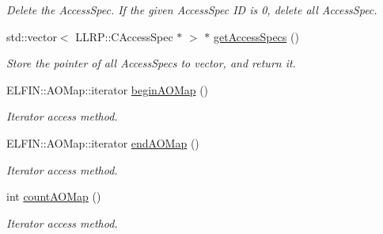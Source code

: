 \begin{DoxyCompactItemize}
\begin{DoxyCompactList}\small\item\em Delete the Access\-Spec. If the given Access\-Spec I\-D is 0, delete all Access\-Spec. \end{DoxyCompactList}\item 
std\-::vector$<$ L\-L\-R\-P\-::\-C\-Access\-Spec $\ast$ $>$ $\ast$ \hyperlink{class_e_l_f_i_n_1_1_a_o_admin_a5bfd2b0c57333304d53c5cea1cdff0f0}{get\-Access\-Specs} ()
\begin{DoxyCompactList}\small\item\em Store the pointer of all Access\-Specs to vector, and return it. \end{DoxyCompactList}\end{DoxyCompactItemize}
{\bf }\par
\begin{DoxyCompactItemize}
\item 
E\-L\-F\-I\-N\-::\-A\-O\-Map\-::iterator \hyperlink{class_e_l_f_i_n_1_1_a_o_admin_abd2953505ee15f57f80bf8d5c094297b}{begin\-A\-O\-Map} ()
\begin{DoxyCompactList}\small\item\em Iterator access method. \end{DoxyCompactList}\item 
E\-L\-F\-I\-N\-::\-A\-O\-Map\-::iterator \hyperlink{class_e_l_f_i_n_1_1_a_o_admin_aafe66a19da5c9033fcd73142981e96c5}{end\-A\-O\-Map} ()
\begin{DoxyCompactList}\small\item\em Iterator access method. \end{DoxyCompactList}\item 
int \hyperlink{class_e_l_f_i_n_1_1_a_o_admin_a09f489a82b270c4f3d26c2b93241a544}{count\-A\-O\-Map} ()
\begin{DoxyCompactList}\small\item\em Iterator access method. \end{DoxyCompactList}\end{DoxyCompactItemize}

